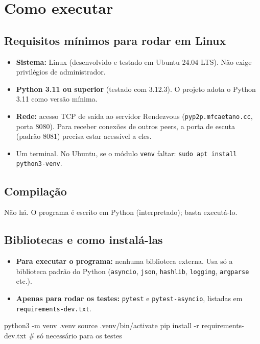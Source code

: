 \documentclass[11pt,a4paper]{article}
\begin{document}
\section{Como executar}

\subsection{Requisitos mínimos para rodar em Linux}
\begin{itemize}
\item \textbf{Sistema:} Linux (desenvolvido e testado em Ubuntu 24.04 LTS). Não exige privilégios de administrador.
\item \textbf{Python 3.11 ou superior} (testado com 3.12.3). O projeto adota o Python 3.11 como versão mínima.
\item \textbf{Rede:} acesso TCP de saída ao servidor Rendezvous (\texttt{pyp2p.mfcaetano.cc}, porta 8080). Para receber conexões de outros peers, a porta de escuta (padrão 8081) precisa estar acessível a eles.
\item Um terminal. No Ubuntu, se o módulo \texttt{venv} faltar: \texttt{sudo apt install python3-venv}.
\end{itemize}

\subsection{Compilação}
Não há. O programa é escrito em Python (interpretado); basta executá-lo.

\subsection{Bibliotecas e como instalá-las}
\begin{itemize}
\item \textbf{Para executar o programa:} nenhuma biblioteca externa. Usa só a biblioteca padrão do Python (\texttt{asyncio}, \texttt{json}, \texttt{hashlib}, \texttt{logging}, \texttt{argparse} etc.).
\item \textbf{Apenas para rodar os testes:} \texttt{pytest} e \texttt{pytest-asyncio}, listadas em \texttt{requirements-dev.txt}.
\end{itemize}
\begin{codigo}
python3 -m venv .venv
source .venv/bin/activate
pip install -r requirements-dev.txt     # só necessário para os testes
\end{codigo}
\end{document}
